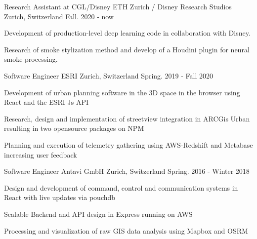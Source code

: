 

\begin{cventries}
  \cventry
    {Research Assistant at CGL/Disney} %
    {ETH Zurich / Disney Research Studios} %
    {Zurich, Switzerland} %
    {Fall. 2020 - now} %
    {
      \begin{cvitems} %
        \item {Development of production-level deep learning code in collaboration with Disney.}
        \item {Research of smoke stylization method and develop of a Houdini plugin for neural smoke processing.}
      \end{cvitems}
    }

  \cventry
    {Software Engineer} %
    {ESRI} %
    {Zurich, Switzerland} %
    {Spring. 2019 - Fall 2020} %
    {
      \begin{cvitems} %
        \item {Development of urban planning software in the 3D space in the browser using React and the ESRI Js API}
        \item {Research, design and implementation of streetview integration in ARCGis Urban resulting in two opensource packages on NPM}
        \item {Planning and execution of telemetry gathering using AWS-Redshift and Metabase increasing user feedback}
      \end{cvitems}
    }

  \cventry
    {Software Engineer} %
    {Antavi GmbH} %
    {Zurich, Switzerland} %
    {Spring. 2016 - Winter 2018} %
    {
      \begin{cvitems} %
        \item {Design and development of command, control and communication systems in React with live updates via pouchdb}
        \item {Scalable Backend and API design in Express running on AWS}
        \item {Processing and visualization of raw GIS data analysis using Mapbox and OSRM}
      \end{cvitems}
    }


\end{cventries}
